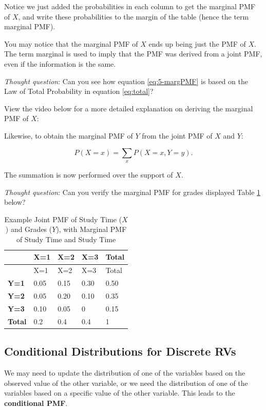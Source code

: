 \documentclass[
]{book}
\begin{document}
Notice we just added the probabilities in each column to get the marginal PMF of \(X\), and write these probabilities to the margin of the table (hence the term marginal PMF).

You may notice that the marginal PMF of \(X\) ends up being just the PMF of \(X\). The term marginal is used to imply that the PMF was derived from a joint PMF, even if the information is the same.

\emph{Thought question}: Can you see how equation \eqref{eq:5-margPMF} is based on the Law of Total Probability in equation \eqref{eq:total}?

View the video below for a more detailed explanation on deriving the marginal PMF of \(X\):

Likewise, to obtain the marginal PMF of \(Y\) from the joint PMF of \(X\) and \(Y\):

\begin{equation} 
P(X=x) = \sum_x P(X=x, Y=y).
\label{eq:5-margPMF2}
\end{equation}

The summation is now performed over the support of \(X\).

\emph{Thought question}: Can you verify the marginal PMF for grades displayed Table \ref{tab:5-marg-table2} below?

\begin{longtable}[]{@{}lllll@{}}
\caption{\label{tab:5-marg-table2} Example Joint PMF of Study Time (\(X\)) and Grades (\(Y\)), with Marginal PMF of Study Time and Study Time}\tabularnewline
\toprule\noalign{}
& X=1 & X=2 & X=3 & Total \\
\midrule\noalign{}
\endfirsthead
\toprule\noalign{}
& X=1 & X=2 & X=3 & Total \\
\midrule\noalign{}
\endhead
\bottomrule\noalign{}
\endlastfoot
\textbf{Y=1} & 0.05 & 0.15 & 0.30 & 0.50 \\
\textbf{Y=2} & 0.05 & 0.20 & 0.10 & 0.35 \\
\textbf{Y=3} & 0.10 & 0.05 & 0 & 0.15 \\
\textbf{Total} & 0.2 & 0.4 & 0.4 & 1 \\
\end{longtable}

\subsection{Conditional Distributions for Discrete RVs}\label{conddist}

We may need to update the distribution of one of the variables based on the observed value of the other variable, or we need the distribution of one of the variables based on a specific value of the other variable. This leads to the \textbf{conditional PMF}.
\end{document}
